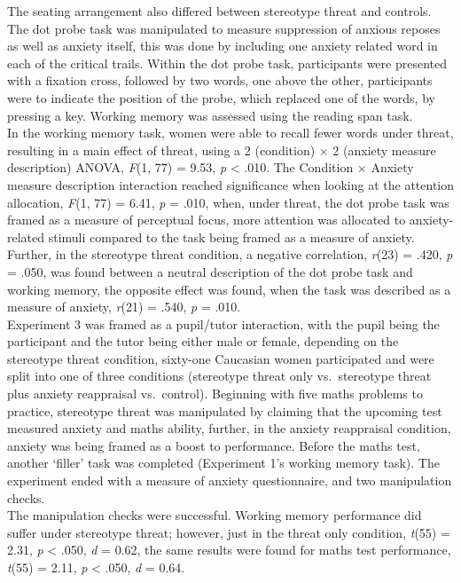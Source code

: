\documentclass[
  stu,floatsintext]{apa7}
\begin{document}
The seating arrangement also differed between stereotype threat and controls.
The dot probe task was manipulated to measure suppression of anxious reposes as well as anxiety itself, this was done by including one anxiety related word in each of the critical trails.
Within the dot probe task, participants were presented with a fixation cross, followed by two words, one above the other, participants were to indicate the position of the probe, which replaced one of the words, by pressing a key.
Working memory was assessed using the reading span task.\\
In the working memory task, women were able to recall fewer words under threat, resulting in a main effect of threat, using a 2 (condition) \(\times\) 2 (anxiety measure description) ANOVA, \emph{F}(1, 77) = 9.53, \emph{p} \textless{} .010.
The Condition \(\times\) Anxiety measure description interaction reached significance when looking at the attention allocation, \emph{F}(1, 77) = 6.41, \emph{p} = .010, when, under threat, the dot probe task was framed as a measure of perceptual focus, more attention was allocated to anxiety-related stimuli compared to the task being framed as a measure of anxiety.
Further, in the stereotype threat condition, a negative correlation, \emph{r}(23) = .420, \emph{p} = .050, was found between a neutral description of the dot probe task and working memory, the opposite effect was found, when the task was described as a measure of anxiety, \emph{r}(21) = .540, \emph{p} = .010.\\
Experiment 3 was framed as a pupil/tutor interaction, with the pupil being the participant and the tutor being either male or female, depending on the stereotype threat condition, sixty-one Caucasian women participated and were split into one of three conditions (stereotype threat only vs.~stereotype threat plus anxiety reappraisal vs.~control).
Beginning with five maths problems to practice, stereotype threat was manipulated by claiming that the upcoming test measured anxiety and maths ability, further, in the anxiety reappraisal condition, anxiety was being framed as a boost to performance.
Before the maths test, another `filler' task was completed (Experiment 1's working memory task).
The experiment ended with a measure of anxiety questionnaire, and two manipulation checks.\\
The manipulation checks were successful.
Working memory performance did suffer under stereotype threat; however, just in the threat only condition, \emph{t}(55) = 2.31, \emph{p} \textless{} .050, \emph{d} = 0.62, the same results were found for maths test performance, \emph{t}(55) = 2.11, \emph{p} \textless{} .050, \emph{d} = 0.64.
\end{document}
